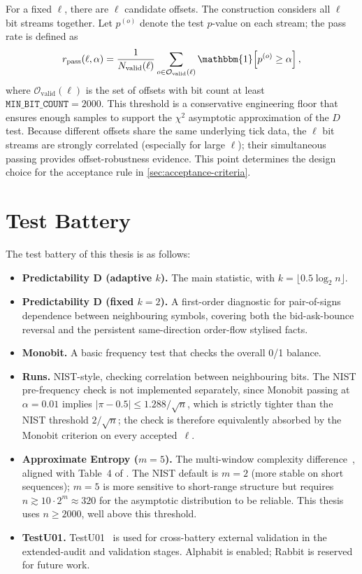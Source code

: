 \documentclass[11pt,titlepage,openany,oneside]{book}  %
\begin{document}
For a fixed $\ell$, there are $\ell$ candidate offsets. The construction considers all $\ell$ bit streams together. Let $p^{(o)}$ denote the test $p$-value on each stream; the pass rate is defined as
\begin{equation}
r_{\text{pass}}(\ell, \alpha) = \frac{1}{N_{\text{valid}}(\ell)} \sum_{o \in \mathcal{O}_{\text{valid}}(\ell)} \mathbbm{1}\!\left[p^{(o)} \ge \alpha\right],
\end{equation}
where $\mathcal{O}_{\text{valid}}(\ell)$ is the set of offsets with bit count at least $\texttt{MIN\_BIT\_COUNT} = 2000$. This threshold is a conservative engineering floor that ensures enough samples to support the $\chi^2$ asymptotic approximation of the $D$ test. Because different offsets share the same underlying tick data, the $\ell$ bit streams are strongly correlated (especially for large $\ell$); their simultaneous passing provides offset-robustness evidence. This point determines the design choice for the acceptance rule in \cref{sec:acceptance-criteria}.

\section{Test Battery}
\label{sec:test-battery}

The test battery of this thesis is as follows:
\begin{itemize}
\item \textbf{Predictability $\boldsymbol{D}$ (adaptive $k$).} The main statistic, with $k = \lfloor 0.5 \log_2 n \rfloor$.
\item \textbf{Predictability $\boldsymbol{D}$ (fixed $k = 2$).} A first-order diagnostic for pair-of-signs dependence between neighbouring symbols, covering both the bid-ask-bounce reversal and the persistent same-direction order-flow stylised facts.
\item \textbf{Monobit.} A basic frequency test that checks the overall 0/1 balance.
\item \textbf{Runs.} NIST-style, checking correlation between neighbouring bits. The NIST pre-frequency check is not implemented separately, since Monobit passing at $\alpha = 0.01$ implies $|\pi - 0.5| \le 1.288/\sqrt{n}$, which is strictly tighter than the NIST threshold $2/\sqrt{n}$; the check is therefore equivalently absorbed by the Monobit criterion on every accepted~$\ell$.
\item \textbf{Approximate Entropy ($m = 5$).} The multi-window complexity difference~\citep{pincus1991apen}, aligned with Table~4 of \citet{onofri2025emergence}. The NIST default is $m = 2$ (more stable on short sequences); $m = 5$ is more sensitive to short-range structure but requires $n \gtrsim 10 \cdot 2^m \approx 320$ for the asymptotic distribution to be reliable. This thesis uses $n \ge 2000$, well above this threshold.
\item \textbf{TestU01.} TestU01~\citep{lecuyer2007testu01} is used for cross-battery external validation in the extended-audit and validation stages. Alphabit is enabled; Rabbit is reserved for future work.
\end{itemize}
\end{document}

